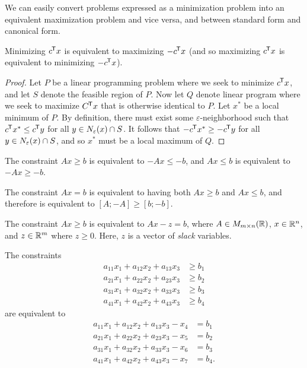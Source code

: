 \begin{rmk}
    We can easily convert problems expressed as a minimization problem into an equivalent maximization problem and vice versa, and between standard form and canonical form.
\end{rmk}

\begin{prop}
    Minimizing ${c}^{\mkern-1.5mu\mathsf{T}}x$ is equivalent to maximizing $-{c}^{\mkern-1.5mu\mathsf{T}}x$ (and so maximizing ${c}^{\mkern-1.5mu\mathsf{T}}x$ is equivalent to minimizing $-{c}^{\mkern-1.5mu\mathsf{T}}x$).
\end{prop}

\begin{proof}
    Let $P$ be a linear programming problem where we seek to minimize ${c}^{\mkern-1.5mu\mathsf{T}}x$, and let $S$ denote the feasible region of $P$. Now let $Q$ denote linear program where we seek to maximize ${C}^{\mkern-1.5mu\mathsf{T}}x$ that is otherwise identical to $P$. Let $x^{*}$ be a local minimum of $P$. By definition, there must exist some $\varepsilon$-neighborhood such that ${c}^{\mkern-1.5mu\mathsf{T}}x^{*} \leq {c}^{\mkern-1.5mu\mathsf{T}}y$ for all $y \in N_{\varepsilon}(x) \cap S$. It follows that $-{c}^{\mkern-1.5mu\mathsf{T}}x^{*} \geq -{c}^{\mkern-1.5mu\mathsf{T}}y$ for all $y \in N_{\varepsilon}(x) \cap S$, and so $x^{*}$ must be a local maximum of $Q$.
\end{proof}

\begin{prop}
    The constraint $Ax \geq b$ is equivalent to $-Ax \leq -b$, and $Ax \leq b$ is equivalent to $-Ax \geq -b$.
\end{prop}

\begin{prop}
    The constraint $Ax = b$ is equivalent to having both $Ax \geq b$ and $Ax \leq b$, and therefore is equivalent to $[A; -A] \geq [b; -b]$.
\end{prop}

\begin{prop}
    The constraint $Ax \geq b$ is equivalent to $Ax - z = b$, where $A \in M_{m \times n}(\mathbb{R})$, $x \in \mathbb{R}^n$, and $z \in \mathbb{R}^m$ where $z \geq 0$. Here, $z$ is a vector of \emph{slack} variables.
\end{prop}

\begin{exmp}
    The constraints
    \begin{align*}
        a_{11}x_1 + a_{12}x_2 + a_{13}x_3 &\geq b_1 \\
        a_{21}x_1 + a_{22}x_2 + a_{23}x_3 &\geq b_2 \\
        a_{31}x_1 + a_{32}x_2 + a_{33}x_3 &\geq b_3 \\
        a_{41}x_1 + a_{42}x_2 + a_{43}x_3 &\geq b_4
    \end{align*}
    are equivalent to
    \begin{align*}
        a_{11}x_1 + a_{12}x_2 + a_{13}x_3 - x_4 &= b_1 \\
        a_{21}x_1 + a_{22}x_2 + a_{23}x_3 - x_5 &= b_2 \\
        a_{31}x_1 + a_{32}x_2 + a_{33}x_3 - x_6 &= b_3 \\
        a_{41}x_1 + a_{42}x_2 + a_{43}x_3 - x_7 &= b_4.
    \end{align*}
\end{exmp}

